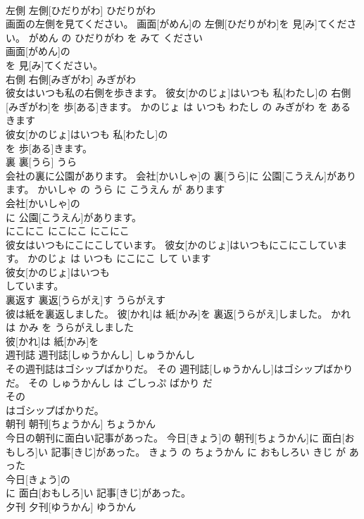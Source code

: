\documentclass[8pt]{extreport}
\begin{document}
\begin{CJK}{UTF8}{min}
\\	左側	左側[ひだりがわ]	ひだりがわ	
\\	画面の左側を見てください。	画面[がめん]の 左側[ひだりがわ]を 見[み]てください。	がめん の ひだりがわ を みて ください	
\\	画面[がめん]の
\\	を 見[み]てください。		
\\	右側	右側[みぎがわ]	みぎがわ	
\\	彼女はいつも私の右側を歩きます。	彼女[かのじょ]はいつも 私[わたし]の 右側[みぎがわ]を 歩[ある]きます。	かのじょ は いつも わたし の みぎがわ を あるきます	
\\	彼女[かのじょ]はいつも 私[わたし]の
\\	を 歩[ある]きます。		
\\	裏	裏[うら]	うら	
\\	会社の裏に公園があります。	会社[かいしゃ]の 裏[うら]に 公園[こうえん]があります。	かいしゃ の うら に こうえん が あります	
\\	会社[かいしゃ]の
\\	に 公園[こうえん]があります。		
\\	にこにこ	にこにこ	にこにこ	
\\	彼女はいつもにこにこしています。	彼女[かのじょ]はいつもにこにこしています。	かのじょ は いつも にこにこ して います	
\\	彼女[かのじょ]はいつも
\\	しています。		
\\	裏返す	裏返[うらがえ]す	うらがえす	
\\	彼は紙を裏返しました。	彼[かれ]は 紙[かみ]を 裏返[うらがえ]しました。	かれ は かみ を うらがえしました	
\\	彼[かれ]は 紙[かみ]を
\\	週刊誌	週刊誌[しゅうかんし]	しゅうかんし	
\\	その週刊誌はゴシップばかりだ。	その 週刊誌[しゅうかんし]はゴシップばかりだ。	その しゅうかんし は ごしっぷ ばかり だ	
\\	その
\\	はゴシップばかりだ。		
\\	朝刊	朝刊[ちょうかん]	ちょうかん	
\\	今日の朝刊に面白い記事があった。	今日[きょう]の 朝刊[ちょうかん]に 面白[おもしろ]い 記事[きじ]があった。	きょう の ちょうかん に おもしろい きじ が あった	
\\	今日[きょう]の
\\	に 面白[おもしろ]い 記事[きじ]があった。		
\\	夕刊	夕刊[ゆうかん]	ゆうかん	

\end{CJK}
\end{document}
